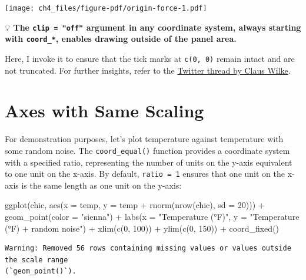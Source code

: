 \documentclass[
  letterpaper,
  DIV=11,
  numbers=noendperiod]{scrreprt}
\newenvironment{Shaded}{\begin{snugshade}}{\end{snugshade}}
\newcommand{\AttributeTok}[1]{\textcolor[rgb]{0.40,0.45,0.13}{#1}}
\newcommand{\DecValTok}[1]{\textcolor[rgb]{0.68,0.00,0.00}{#1}}
\newcommand{\FunctionTok}[1]{\textcolor[rgb]{0.28,0.35,0.67}{#1}}
\newcommand{\NormalTok}[1]{\textcolor[rgb]{0.00,0.23,0.31}{#1}}
\newcommand{\SpecialCharTok}[1]{\textcolor[rgb]{0.37,0.37,0.37}{#1}}
\newcommand{\StringTok}[1]{\textcolor[rgb]{0.13,0.47,0.30}{#1}}
\begin{document}
\texttt{[image: ch4\_files/figure-pdf/origin-force-1.pdf]}

💡 \textbf{The \texttt{clip\ =\ "off"} argument in any coordinate
system, always starting with \texttt{coord\_*}, enables drawing outside
of the panel area.}

Here, I invoke it to ensure that the tick marks at \texttt{c(0,\ 0)}
remain intact and are not truncated. For further insights, refer to the
\href{https://twitter.com/clauswilke/status/991542952802619392?lang=en}{Twitter
thread by Claus Wilke}.

\section{Axes with Same Scaling}\label{axes-with-same-scaling}

For demonstration purposes, let's plot temperature against temperature
with some random noise. The \texttt{coord\_equal()} function provides a
coordinate system with a specified ratio, representing the number of
units on the y-axis equivalent to one unit on the x-axis. By default,
\texttt{ratio\ =\ 1} ensures that one unit on the x-axis is the same
length as one unit on the y-axis:

\begin{Shaded}
\begin{Highlighting}[]
\FunctionTok{ggplot}\NormalTok{(chic, }\FunctionTok{aes}\NormalTok{(}\AttributeTok{x =}\NormalTok{ temp, }\AttributeTok{y =}\NormalTok{ temp }\SpecialCharTok{+} \FunctionTok{rnorm}\NormalTok{(}\FunctionTok{nrow}\NormalTok{(chic), }\AttributeTok{sd =} \DecValTok{20}\NormalTok{))) }\SpecialCharTok{+}
  \FunctionTok{geom\_point}\NormalTok{(}\AttributeTok{color =} \StringTok{"sienna"}\NormalTok{) }\SpecialCharTok{+}
  \FunctionTok{labs}\NormalTok{(}\AttributeTok{x =} \StringTok{"Temperature (°F)"}\NormalTok{, }\AttributeTok{y =} \StringTok{"Temperature (°F) + random noise"}\NormalTok{) }\SpecialCharTok{+}
  \FunctionTok{xlim}\NormalTok{(}\FunctionTok{c}\NormalTok{(}\DecValTok{0}\NormalTok{, }\DecValTok{100}\NormalTok{)) }\SpecialCharTok{+} \FunctionTok{ylim}\NormalTok{(}\FunctionTok{c}\NormalTok{(}\DecValTok{0}\NormalTok{, }\DecValTok{150}\NormalTok{)) }\SpecialCharTok{+}
  \FunctionTok{coord\_fixed}\NormalTok{()}
\end{Highlighting}
\end{Shaded}

\begin{verbatim}
Warning: Removed 56 rows containing missing values or values outside the scale range
(`geom_point()`).
\end{verbatim}
\end{document}
